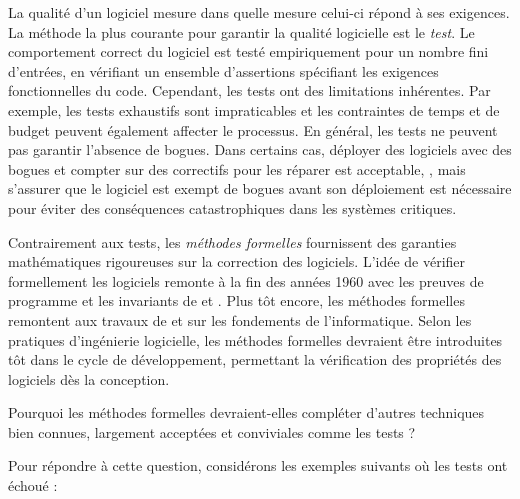 {\em

La qualité d'un logiciel mesure dans quelle mesure celui-ci répond à ses exigences. La méthode la plus courante pour garantir la qualité logicielle est le \emph{test}. Le comportement correct du logiciel est testé empiriquement pour un nombre fini d'entrées, en vérifiant un ensemble d'assertions spécifiant les exigences fonctionnelles du code. Cependant, les tests ont des limitations inhérentes. Par exemple, les tests exhaustifs sont impraticables et les contraintes de temps et de budget peuvent également affecter le processus. En général, les tests ne peuvent pas garantir l'absence de bogues. Dans certains cas, déployer des logiciels avec des bogues et compter sur des correctifs pour les réparer est acceptable, \cf{} , mais s'assurer que le logiciel est exempt de bogues avant son déploiement est nécessaire pour éviter des conséquences catastrophiques dans les systèmes critiques.

Contrairement aux tests, les \emph{méthodes formelles} fournissent des garanties mathématiques rigoureuses sur la correction des logiciels. L'idée de vérifier formellement les logiciels remonte à la fin des années 1960 avec les preuves de programme et les invariants de  et . Plus tôt encore, les méthodes formelles remontent aux travaux de  et  sur les fondements de l'informatique. Selon les pratiques d'ingénierie logicielle, les méthodes formelles devraient être introduites tôt dans le cycle de développement, permettant la vérification des propriétés des logiciels dès la conception.

\begin{center}
  Pourquoi les méthodes formelles devraient-elles compléter d'autres techniques bien connues, largement acceptées et conviviales comme les tests ?
\end{center}

Pour répondre à cette question, considérons les exemples suivants où les tests ont échoué :

}
